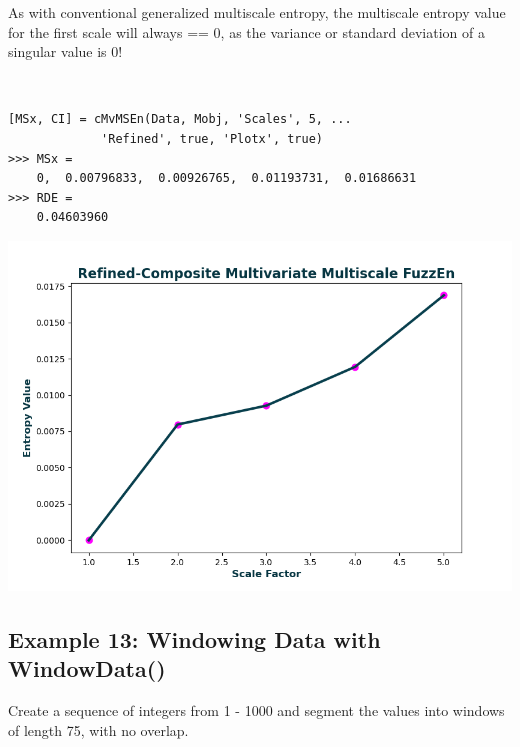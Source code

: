 \documentclass[12pt, a4paper, titlepage, openany]{book}
\begin{document}
\begin{tcolorbox}[colback=ehone!5, colframe=ehtwo!, title=\hypertarget{bidinote}{\textbf{NOTE}}, label={BiBox}]
As with conventional generalized multiscale entropy, the multiscale entropy value for the first scale will always == 0, as the variance or standard deviation of a singular value is 0!
\end{tcolorbox} \

\begin{verbatim}
[MSx, CI] = cMvMSEn(Data, Mobj, 'Scales', 5, ...
			 'Refined', true, 'Plotx', true)
>>> MSx =
    0,  0.00796833,  0.00926765,  0.01193731,  0.01686631
>>> RDE =
    0.04603960
\end{verbatim}
\includegraphics[scale=.7]{rcMvMSEn.png}




\newpage
\subsection{\normalsize Example 13: \hspace{15mm} Windowing Data with WindowData()}
\noindent Create a sequence of integers from 1 - 1000 and segment the values into windows of length 75, with no overlap.
\end{document}
